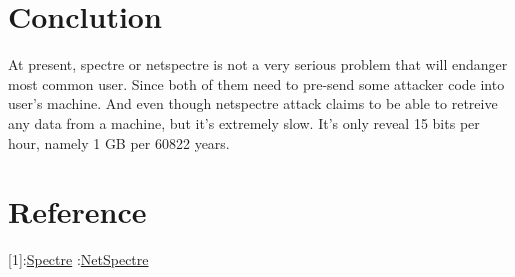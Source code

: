 \documentclass{article}
\begin{document}
\section{Conclution}
At present, spectre or netspectre is not a very serious problem that will endanger most common user. Since both of them need to pre-send some attacker code into user's machine. And even though netspectre attack claims to be able to retreive any data from a machine, but it's extremely slow. It's only reveal 15 bits per hour, namely 1 GB per 60822 years.
\section{Reference}
[1]:\href{https://spectreattack.com/spectre.pdf}{Spectre}
\newline
[2]:\href{https://arxiv.org/pdf/1807.10535.pdf}{NetSpectre}
\end{document}
